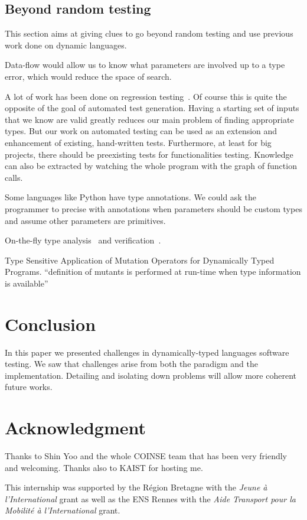 \documentclass{llncs2e/llncs}
\begin{document}
\subsection{Beyond random testing}

This section aims at giving clues to go beyond random testing and use previous
work done on dynamic languages.

Data-flow would allow us to know what parameters are involved up to a type
error, which would reduce the space of search.

A lot of work has been done on regression
testing~\cite{gligoric2011smutant,haupt2011type,steinert2010continuous,yoo2012regression}.
Of course this is quite the opposite of the goal of automated test generation.
Having a starting set of inputs that we know are valid greatly reduces our main
problem of finding appropriate types. But our work on automated testing can be
used as an extension and enhancement of existing, hand-written tests.
Furthermore, at least for big projects, there should be preexisting tests for
functionalities testing. Knowledge can also be extracted by watching the whole
program with the graph of function calls.

Some languages like Python have type annotations. We could ask the programmer to
precise with annotations when parameters should be custom types and assume other
parameters are primitives.

On-the-fly type analysis~\cite{chambers1991iterative} and
verification~\cite{chugh2012nested}.

Type Sensitive Application of Mutation Operators for Dynamically Typed Programs.
``definition of mutants is performed at run-time when type information is
available''~\cite{bottaci2010type}


\section{Conclusion}
\label{conclusion}

In this paper we presented challenges in dynamically-typed languages software
testing. We saw that challenges arise from both the paradigm and the
implementation. Detailing and isolating down problems will allow more coherent
future works.


\section*{Acknowledgment}
Thanks to Shin Yoo and the whole COINSE team that has been very friendly and
welcoming. Thanks also to KAIST for hosting me.

This internship was supported by the R\'egion Bretagne with the \textit{Jeune
\`a l'International} grant as well as the ENS Rennes with the \textit{Aide
Transport pour la Mobilit\'e \`a l'International} grant.



\end{document}
